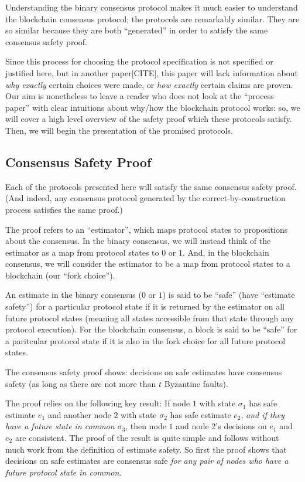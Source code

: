 \documentclass{article}
\theoremstyle{definition}
\begin{document}
Understanding the binary consensus protocol makes it much easier to understand the blockchain consensus protocol; the protocols are remarkably similar. They are so similar because they are both ``generated'' in order to satisfy the same consensus safety proof.

Since this process for choosing the protocol specification is not specified or justified here, but in another paper[CITE], this paper will lack information about \emph{why exactly} certain choices were made, or \emph{how exactly} certain claims are proven. Our aim is nonetheless to leave a reader who does not look at the ``process paper'' with clear intuitions about why/how the blockchain protocol works: so, we will cover a high level overview of the safety proof which these protocols satisfy. Then, we will begin the presentation of the promised protocols.

\subsection{Consensus Safety Proof}

Each of the protocols presented here will satisfy the same consensus safety proof. (And indeed, any consensus protocol generated by the correct-by-construction process satisfies the same proof.) 

The proof refers to an ``estimator'', which maps protocol states to propositions about the consensus. In the binary consensus, we will instead think of the estimator as a map from protocol states to $0$ or $1$. And, in the blockchain consensus, we will consider the estimator to be a map from protocol states to a blockchain (our ``fork choice'').

An estimate in the binary consensus ($0$ or $1$) is said to be ``safe'' (have ``estimate safety'') for a particular protocol state if it is returned by the estimator on all future protocol states (meaning all states accessible from that state through any protocol execution). For the blockchain consensus, a block is said to be ``safe'' for a paritcular protocol state if it is also in the fork choice for all future protocol states.

The consensus safety proof shows: decisions on safe estimates have consensus safety (as long as there are not more than $t$ Byzantine faults). 

The proof relies on the following key result: If node $1$ with state $\sigma_1$ has safe estimate $e_1$ and another node $2$ with state $\sigma_2$ has safe estimate $e_2$, \emph{and if they have a future state in common $\sigma_3$}, then node $1$ and node $2$'s decisions on $e_1$ and $e_2$ are consistent. The proof of the result is quite simple and follows without much work from the definition of estimate safety. So first the proof shows that decisions on safe estimates are consensus safe \emph{for any pair of nodes who have a future protocol state in common}.
\end{document}
